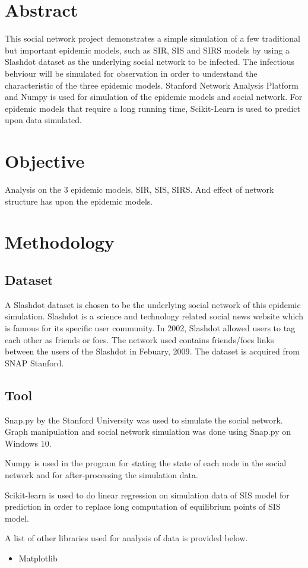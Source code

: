 \documentclass{subfiles}
\begin{document}
  \section{Abstract}
  This social network project demonstrates a simple simulation of a few traditional but important epidemic models, such as SIR, SIS and SIRS models by using a Slashdot dataset as the underlying social network to be infected. The infectious behviour will be simulated for observation in order to understand the characteristic of the three epidemic models. Stanford Network Analysis Platform and Numpy is used for simulation of the epidemic models and social network. For epidemic models that require a long running time, Scikit-Learn is used to predict upon data simulated.
  \section{Objective}
  Analysis on the 3 epidemic models, SIR, SIS, SIRS. And effect of network structure has upon the epidemic models.
  \section{Methodology}
  \subsection{Dataset}
  A Slashdot dataset is chosen to be the underlying social network of this epidemic simulation. Slashdot is a science and technology related social news website which is famous for its specific user community. In 2002, Slashdot allowed users to tag each other as friends or foes. The network used contains friends/foes links between the users of the Slashdot in Febuary, 2009\cite{leskovec2008community, snapnets}. The dataset is acquired from SNAP Stanford\cite{snapnets}.
  \subsection{Tool}
  Snap.py by the Stanford University was used to simulate the social network. Graph manipulation and social network simulation was done using Snap.py on Windows 10\cite{leskovec2016snap}.

  Numpy is used in the program for stating the state of each node in the social network and for after-processing the simulation data\cite{2020SciPy-NMeth}.

  Scikit-learn is used to do linear regression on simulation data of SIS model for prediction in order to replace long computation of equilibrium points of SIS model\cite{scikit-learn}.

  A list of other libraries used for analysis of data is provided below.
  \begin{itemize}
    \item Matplotlib \cite{Hunter:2007}
  \end{itemize}
\end{document}
